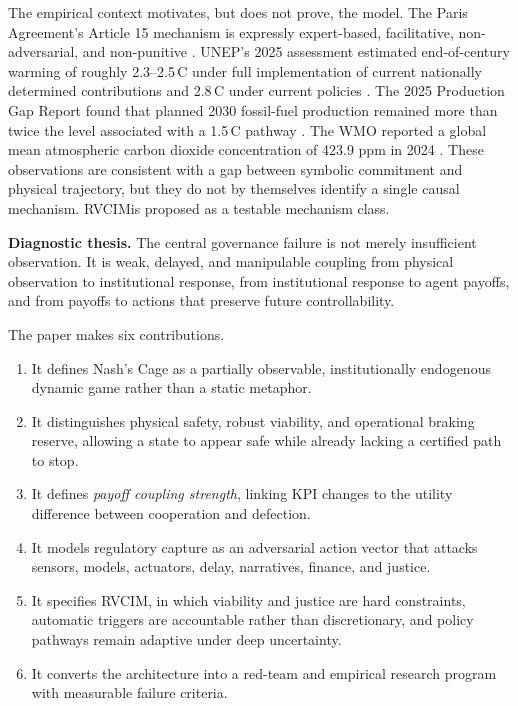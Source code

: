 \documentclass[11pt,a4paper]{article}
\numberwithin{equation}{section}
\theoremstyle{definition}
\theoremstyle{plain}
\theoremstyle{remark}
\newcommand{\RVCIM}{\textsc{RVCIM}}
\begin{document}
The empirical context motivates, but does not prove, the model. The Paris Agreement's Article 15 mechanism is expressly expert-based, facilitative, non-adversarial, and non-punitive \citep{unfccc2015,unfcccpaicc}. UNEP's 2025 assessment estimated end-of-century warming of roughly 2.3--2.5\,\textdegree C under full implementation of current nationally determined contributions and 2.8\,\textdegree C under current policies \citep{unep2025}. The 2025 Production Gap Report found that planned 2030 fossil-fuel production remained more than twice the level associated with a 1.5\,\textdegree C pathway \citep{productiongap2025}. The WMO reported a global mean atmospheric carbon dioxide concentration of 423.9 ppm in 2024 \citep{wmo2025}. These observations are consistent with a gap between symbolic commitment and physical trajectory, but they do not by themselves identify a single causal mechanism. \RVCIM is proposed as a testable mechanism class.

\begin{corebox}
\textbf{Diagnostic thesis.} The central governance failure is not merely insufficient observation. It is weak, delayed, and manipulable coupling from physical observation to institutional response, from institutional response to agent payoffs, and from payoffs to actions that preserve future controllability.
\end{corebox}

The paper makes six contributions.

\begin{enumerate}
  \item It defines Nash's Cage as a partially observable, institutionally endogenous dynamic game rather than a static metaphor.
  \item It distinguishes physical safety, robust viability, and operational braking reserve, allowing a state to appear safe while already lacking a certified path to stop.
  \item It defines \emph{payoff coupling strength}, linking KPI changes to the utility difference between cooperation and defection.
  \item It models regulatory capture as an adversarial action vector that attacks sensors, models, actuators, delay, narratives, finance, and justice.
  \item It specifies \RVCIM, in which viability and justice are hard constraints, automatic triggers are accountable rather than discretionary, and policy pathways remain adaptive under deep uncertainty.
  \item It converts the architecture into a red-team and empirical research program with measurable failure criteria.
\end{enumerate}
\end{document}
